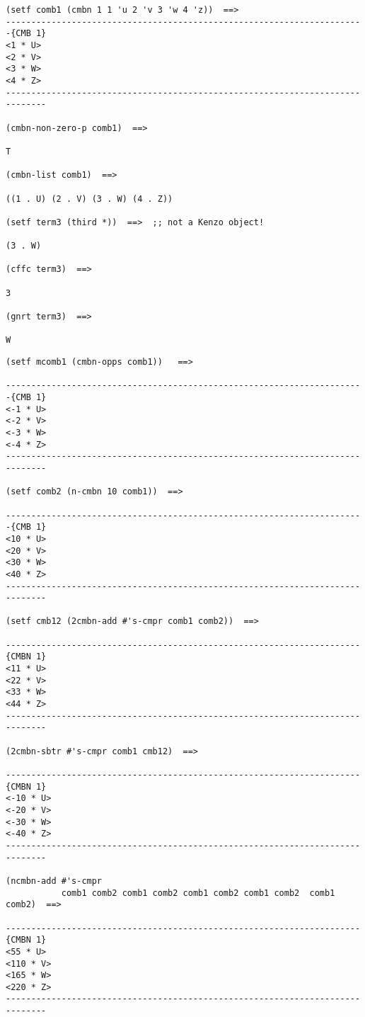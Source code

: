 {\footnotesize\begin{verbatim}
(setf comb1 (cmbn 1 1 'u 2 'v 3 'w 4 'z))  ==>
-----------------------------------------------------------------------{CMB 1}
<1 * U>
<2 * V>
<3 * W>
<4 * Z>
------------------------------------------------------------------------------

(cmbn-non-zero-p comb1)  ==>

T

(cmbn-list comb1)  ==>

((1 . U) (2 . V) (3 . W) (4 . Z))

(setf term3 (third *))  ==>  ;; not a Kenzo object!

(3 . W)

(cffc term3)  ==>

3

(gnrt term3)  ==>

W
\end{verbatim}}
\newpage
{\footnotesize\begin{verbatim}
(setf mcomb1 (cmbn-opps comb1))   ==>

-----------------------------------------------------------------------{CMB 1}
<-1 * U>
<-2 * V>
<-3 * W>
<-4 * Z>
------------------------------------------------------------------------------

(setf comb2 (n-cmbn 10 comb1))  ==>

-----------------------------------------------------------------------{CMB 1}
<10 * U>
<20 * V>
<30 * W>
<40 * Z>
------------------------------------------------------------------------------

(setf cmb12 (2cmbn-add #'s-cmpr comb1 comb2))  ==>

----------------------------------------------------------------------{CMBN 1}
<11 * U>
<22 * V>
<33 * W>
<44 * Z>
------------------------------------------------------------------------------

(2cmbn-sbtr #'s-cmpr comb1 cmb12)  ==>

----------------------------------------------------------------------{CMBN 1}
<-10 * U>
<-20 * V>
<-30 * W>
<-40 * Z>
------------------------------------------------------------------------------

(ncmbn-add #'s-cmpr
           comb1 comb2 comb1 comb2 comb1 comb2 comb1 comb2  comb1 comb2)  ==>

----------------------------------------------------------------------{CMBN 1}
<55 * U>
<110 * V>
<165 * W>
<220 * Z>
------------------------------------------------------------------------------

\end{verbatim}}
\newpage

